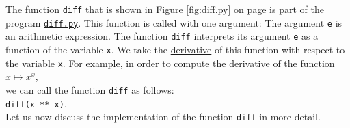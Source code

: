 \noindent
The function \texttt{diff} that is shown in Figure \ref{fig:diff.py} on page \pageref{fig:diff.py} is part
of the program
\href{https://github.com/karlstroetmann/Logic/blob/master/Python/diff.py}{\texttt{diff.py}}.
This function is called with one argument:
The argument \texttt{e} is an arithmetic expression.
The function \texttt{diff} interprets its argument \texttt{e} as a function of the variable
\texttt{x}.  We take the \href{https://en.wikipedia.org/wiki/Derivative}{derivative} of this
function with respect to the variable \texttt{x}.  For example, in order to compute the derivative of
the function
\\[0.2cm]
\hspace*{1.3cm}
$x \mapsto x^x$,
\\[0.2cm]
we can call the function  \texttt{diff} as follows:
\\[0.2cm]
\hspace*{1.3cm}
\texttt{diff(x ** x)}.
\\[0.2cm]
Let us now discuss the implementation of the function \texttt{diff} in more detail.  
